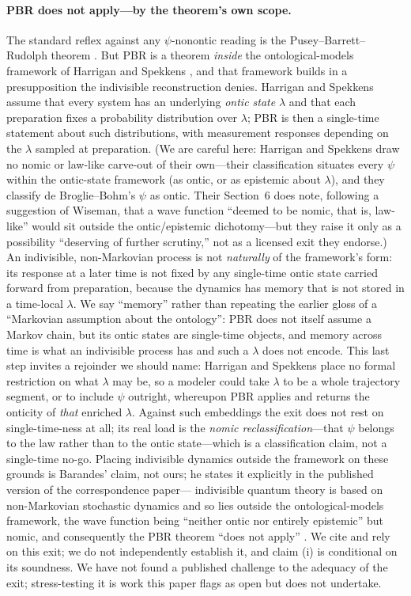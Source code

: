 \documentclass[11pt]{article}
\theoremstyle{remark}
\begin{document}
\paragraph{PBR does not apply---by the theorem's own scope.}
The standard reflex against any $\psi$-nonontic reading is the
Pusey--Barrett--Rudolph theorem \cite{PBR}. But PBR is a theorem
\emph{inside} the ontological-models framework of Harrigan and
Spekkens \cite{HS2010}, and that framework builds in a presupposition
the indivisible reconstruction denies. Harrigan and Spekkens assume
that every system has an underlying \emph{ontic state} $\lambda$ and
that each preparation fixes a probability distribution over $\lambda$;
PBR is then a single-time statement about such distributions, with
measurement responses depending on the $\lambda$ sampled at
preparation. (We are careful here: Harrigan and Spekkens draw no
nomic or law-like carve-out of their own---their classification
situates every $\psi$ within the ontic-state framework (as ontic, or as
epistemic about $\lambda$), and they classify
de Broglie--Bohm's $\psi$ as ontic. Their Section~6 does note, following
a suggestion of Wiseman, that a wave function ``deemed to be nomic, that
is, law-like'' would sit outside the ontic/epistemic dichotomy---but they
raise it only as a possibility ``deserving of further scrutiny,'' not as
a licensed exit they endorse.) An indivisible, non-Markovian process is not \emph{naturally} of the
framework's form: its response at a later time is not fixed by any
single-time ontic state carried forward from preparation, because the
dynamics has memory that is not stored in a time-local $\lambda$. We
say ``memory'' rather than repeating the earlier gloss of a
``Markovian assumption about the ontology'': PBR does not itself
assume a Markov chain, but its ontic states are single-time objects,
and memory across time is what an indivisible process has and such a
$\lambda$ does not encode. This last step invites a rejoinder we should
name: Harrigan and Spekkens place no formal restriction on what
$\lambda$ may be, so a modeler could take $\lambda$ to be a whole
trajectory segment, or to include $\psi$ outright, whereupon PBR applies
and returns the onticity of \emph{that} enriched $\lambda$. Against such
embeddings the exit does not rest on single-time-ness at all; its real
load is the \emph{nomic reclassification}---that $\psi$ belongs to the
law rather than to the ontic state---which is a classification claim,
not a single-time no-go. Placing indivisible dynamics outside the
framework on these grounds is Barandes' claim, not ours; he states it
explicitly in the published version of the correspondence paper---%
indivisible quantum theory is based on non-Markovian stochastic
dynamics and so lies outside the ontological-models framework, the
wave function being ``neither ontic nor entirely epistemic'' but
nomic, and consequently the PBR theorem ``does not apply''
\cite{BarandesPoP}. We cite and rely on this exit; we do not
independently establish it, and claim (i) is conditional on its
soundness. We have not found a published challenge to the adequacy of
the exit; stress-testing it is work this paper flags as open but does
not undertake.
\end{document}
